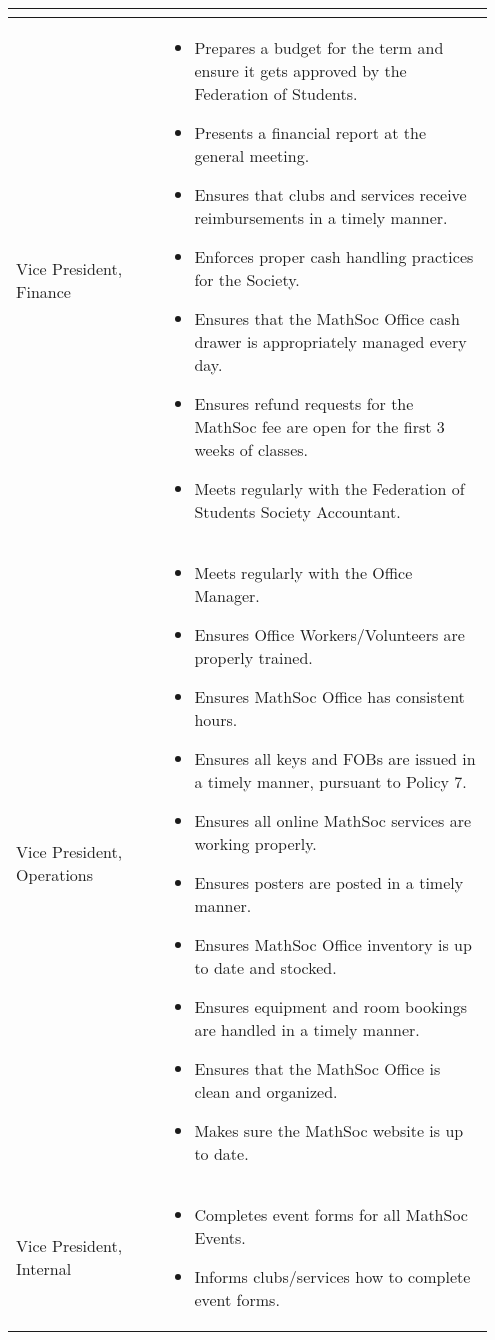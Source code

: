 \documentclass[12pt, letterpaper]{article}
\begin{document}
\begin{longtable}{p{0.3\linewidth} p{0.65\linewidth}}
\begin{itemize}
	\end{itemize}
	\\
	\midrule
	Vice President, Finance &
	\begin{itemize}
		\item Prepares a budget for the term and ensure it gets approved by the Federation of Students.
		\item Presents a financial report at the general meeting.
		\item Ensures that clubs and services receive reimbursements in a timely manner.
		\item Enforces proper cash handling practices for the Society.
		\item Ensures that the MathSoc Office cash drawer is appropriately managed every day.
		\item Ensures refund requests for the MathSoc fee are open for the first 3 weeks of classes.
		\item Meets regularly with the Federation of Students Society Accountant.
	\end{itemize}
	\\
	\midrule
	Vice President, Operations & 
	\begin{itemize}
		\item Meets regularly with the Office Manager.
		\item Ensures Office Workers/Volunteers are properly trained.
		\item Ensures MathSoc Office has consistent hours.
		\item Ensures all keys and FOBs are issued in a timely manner, pursuant to
		Policy 7.
		\item Ensures all online MathSoc services are working properly.
		\item Ensures posters are posted in a timely manner.
		\item Ensures MathSoc Office inventory is up to date and stocked.
		\item Ensures equipment and room bookings are handled in a timely
		manner.
		\item Ensures that the MathSoc Office is clean and organized.
		\item Makes sure the MathSoc website is up to date.
	\end{itemize}
	\\
	\midrule
	Vice President, Internal & 
	\begin{itemize}
		\item Completes event forms for all MathSoc Events.
		\item Informs clubs/services how to complete event forms.

\end{itemize}
\end{longtable}
\end{document}
